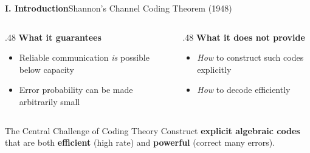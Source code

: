 \begin{frame}{\textbf{I. Introduction}}{Shannon's Channel Coding Theorem (1948)}


\bigskip
\begin{columns}[T,onlytextwidth]
  \begin{column}{.48\textwidth}
    \textcolor{TealDarkCyan}{\textbf{What it guarantees}}
    \begin{itemize}\small
      \item Reliable communication \emph{is} possible below capacity
      \item Error probability can be made arbitrarily small
    \end{itemize}
  \end{column}
  \begin{column}{.48\textwidth}
    \textcolor{AccentCyan!80!black}{\textbf{What it does not provide}}
    \begin{itemize}\small
      \item \emph{How} to construct such codes explicitly
      \item \emph{How} to decode efficiently
    \end{itemize}
  \end{column}
\end{columns}

\bigskip
\begin{alertblock}{The Central Challenge of Coding Theory}
\centering
Construct \textbf{explicit algebraic codes} that are both \textbf{efficient} (high rate) and \textbf{powerful} (correct many errors).
\end{alertblock}
\end{frame}

